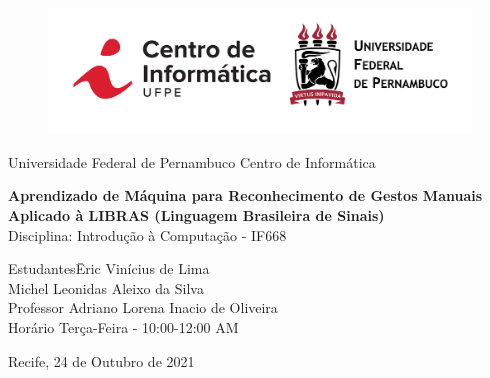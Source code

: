 \documentclass[a4paper, 12pt]{article}
\begin{document}
\begin{titlepage}
	\begin{center}

\vspace{10pt}
\begin{figure}[!ht]
\centering
\includegraphics[scale=0.2]{img/logo_university.png}
\end{figure}


\huge{Universidade Federal de Pernambuco}
\huge{Centro de Informática}

        
        \vspace{75pt}
        
		\textbf{\LARGE{Aprendizado de Máquina para Reconhecimento de Gestos Manuais Aplicado à LIBRAS (Linguagem Brasileira de Sinais)}}\\
		\vspace{35pt}
		\large{Disciplina: Introdução à Computação - IF668\cite{course}}
		\vspace{60pt}
		
	\end{center}
	
	\begin{flushleft}
		\begin{tabbing}
			Estudantes\qquad\qquad\= Eric Vinícius de Lima\cite{eric}\\
			\>Michel Leonidas Aleixo da Silva\cite{michel}\\
			Professor\> Adriano Lorena Inacio de Oliveira\cite{adriano} \\
			Horário\> Terça-Feira - 10:00-12:00 AM\\
		
	\end{tabbing}
		  
	\end{flushleft}
	
	\begin{center}
		\vspace{25pt}
		Recife, 24 de Outubro de 2021
	\end{center}
\end{titlepage}
\end{document}
